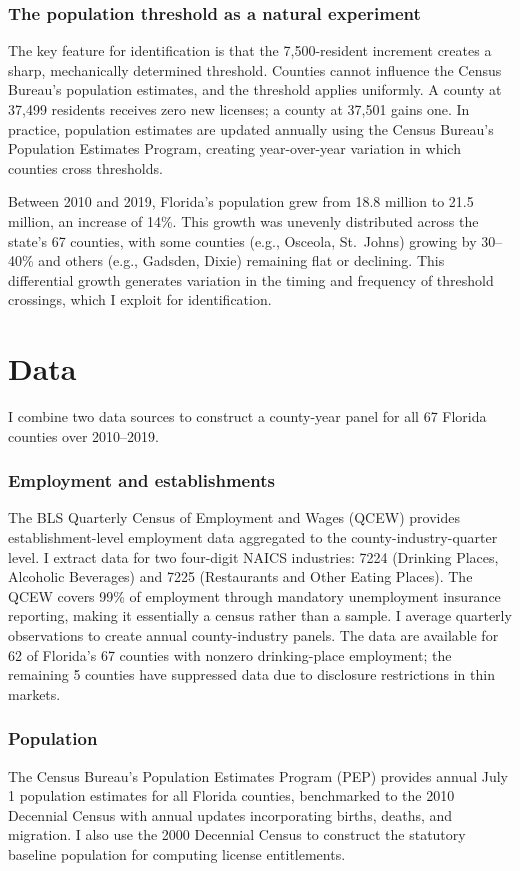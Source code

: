 \documentclass[12pt]{article}
\begin{document}
\subsubsection*{The population threshold as a natural experiment} The key feature for identification is that the 7,500-resident increment creates a sharp, mechanically determined threshold. Counties cannot influence the Census Bureau's population estimates, and the threshold applies uniformly. A county at 37,499 residents receives zero new licenses; a county at 37,501 gains one. In practice, population estimates are updated annually using the Census Bureau's Population Estimates Program, creating year-over-year variation in which counties cross thresholds.

Between 2010 and 2019, Florida's population grew from 18.8 million to 21.5 million, an increase of 14\%. This growth was unevenly distributed across the state's 67 counties, with some counties (e.g., Osceola, St.\ Johns) growing by 30--40\% and others (e.g., Gadsden, Dixie) remaining flat or declining. This differential growth generates variation in the timing and frequency of threshold crossings, which I exploit for identification.

\section{Data}

I combine two data sources to construct a county-year panel for all 67 Florida counties over 2010--2019.

\subsubsection*{Employment and establishments} The BLS Quarterly Census of Employment and Wages (QCEW) provides establishment-level employment data aggregated to the county-industry-quarter level. I extract data for two four-digit NAICS industries: 7224 (Drinking Places, Alcoholic Beverages) and 7225 (Restaurants and Other Eating Places). The QCEW covers 99\% of employment through mandatory unemployment insurance reporting, making it essentially a census rather than a sample. I average quarterly observations to create annual county-industry panels. The data are available for 62 of Florida's 67 counties with nonzero drinking-place employment; the remaining 5 counties have suppressed data due to disclosure restrictions in thin markets.

\subsubsection*{Population} The Census Bureau's Population Estimates Program (PEP) provides annual July 1 population estimates for all Florida counties, benchmarked to the 2010 Decennial Census with annual updates incorporating births, deaths, and migration. I also use the 2000 Decennial Census to construct the statutory baseline population for computing license entitlements.
\end{document}
